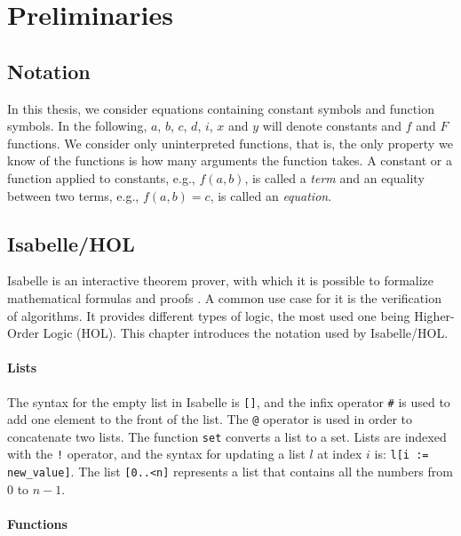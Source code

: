 
\chapter{Preliminaries}\label{chapter:preliminaries}

\section{Notation}

In this thesis, we consider equations containing constant symbols and function symbols. In the following, $a$, $b$, $c$, $d$, $i$, $x$ and $y$ will denote constants and $f$ and $F$ functions.
We consider only uninterpreted functions, that is, the only property we know of the functions is how many arguments the function takes.
A constant or a function applied to constants, e.g., $f(a, b)$, is called a \emph{term} and an equality between two terms, e.g., $f(a, b) = c$, is called an \emph{equation}.



\section{Isabelle/HOL}

Isabelle is an interactive theorem prover, with which it is possible to formalize mathematical formulas and proofs \cite{isabelle}. A common use case for it is the verification of algorithms.
It provides different types of logic, the most used one being Higher-Order Logic (HOL). This chapter introduces the notation used by Isabelle/HOL.

\subsubsection{Lists}

The syntax for the empty list in Isabelle is \lstinline|[]|, and the infix operator \lstinline|#| is used to add one element to the front of the list.
The \lstinline|@| operator is used in order to concatenate two lists.
The function \lstinline|set| converts a list to a set.
Lists are indexed with the \lstinline|!| operator, and the syntax for updating a list $l$ at index $i$ is: \lstinline|l[i := new_value]|. The list \lstinline|[0..<n]| represents a list that contains all the numbers from $0$ to $n-1$.

\subsubsection{Functions}

